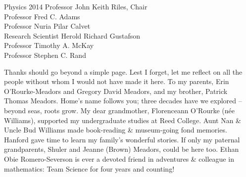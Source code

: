 \documentclass[leqno,twoside]{report}
\theoremstyle{plain}
\theoremstyle{definition}
\theoremstyle{remark}
\numberwithin{theorem}{chapter}        %
\begin{document}





{Physics} {2014}
{ Professor John Keith Riles, Chair \\
  Professor Fred C. Adams\\
  Professor Nuria Pilar Calvet\\
  Research Scientist Herold Richard Gustafson\\
  Professor Timothy A. McKay\\
  Professor Stephen C. Rand
 }



\initializefrontsections

{}

\setcounter{page}{1}


\startacknowledgementspage


Thanks should go beyond a simple page. 
Lest I forget, let me reflect on all the people without whom I would not have made it here. 
To my parents, Erin O'Rourke-Meadors and Gregory David Meadors, and my brother, Patrick Thomas Meadors. 
Home's name follows you; three decades have we explored -- beyond seas, roots grow.
My dear grandmother, Florenceann O'Rourke (n\'{e}e Williams), supported my undergraduate studies at Reed College.
Aunt Nan \& Uncle Bud Williams made book-reading \& museum-going fond memories.
Hanford gave time to learn my family's wonderful stories.
If only my paternal grandparents, Shuler and Jeanne (Brown) Meadors, could be here too.
Ethan Obie Romero-Severson is ever a devoted friend in adventures \& colleague in mathematics: Team Science for four years and counting!
\end{document}
